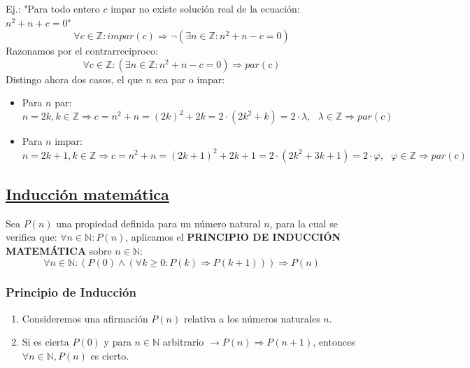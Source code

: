 \documentclass[10pt,a4paper,openright]{book}
\begin{document}
Ej.: "Para todo entero $c$ impar no existe solución real de la ecuación: $n^2+n+c=0$"
$$\forall c \in \mathbb Z : impar \left(c\right) \Rightarrow \neg \left(\exists n \in \mathbb Z : n^2+n-c=0\right)$$
Razonamos por el contrarreciproco:
$$\forall c \in \mathbb Z: \left(\exists n \in \mathbb Z : n^2+n-c=0\right)\Rightarrow par(c)$$
Distingo ahora dos casos, el que $n$ sea par o impar:
\begin{itemize}
\item Para $n$ par:
$$n=2k, k\in \mathbb Z \Rightarrow c=n^2+n=(2k)^2+2k=2\cdot(2k^2+k)=2\cdot \lambda,\mbox{ } \lambda \in \mathbb Z \Rightarrow par(c)$$
\item Para $n$ impar:
$$n=2k+1, k\in \mathbb Z \Rightarrow c=n^2+n=(2k+1)^2+2k+1=2\cdot(2k^2+3k+1)=2\cdot \varphi,\mbox{ } \varphi \in \mathbb Z \Rightarrow par(c)$$
\end{itemize}

\subsection*{\underline{Inducción matemática}}
Sea $P(n)$ una propiedad definida para un número natural $n$, para la cual se verifica que: $\forall n \in \mathbb N : P(n)$, aplicamos el \textbf{PRINCIPIO DE INDUCCIÓN MATEMÁTICA} sobre $n \in \mathbb N$:
$$\forall n \in \mathbb N: \left(P(0)\wedge \left(\forall k \geq 0: P(k)\Rightarrow P(k+1)\right)\right)\Rightarrow P(n)$$

\subsubsection*{Principio de Inducción}
\begin{enumerate}
\item Consideremos una afirmación $P(n)$ relativa a los números naturales $n$.
\item Si es cierta $P(0)$ y para $n\in \mathbb N$ arbitrario $\rightarrow P(n)\Rightarrow P(n+1)$, entonces $\forall n\in \mathbb N,P(n)$ es cierto.
\end{enumerate}
\end{document}
